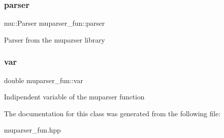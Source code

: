 \subsubsection{\texorpdfstring{parser}{parser}}
{\footnotesize\ttfamily mu\+::\+Parser muparser\+\_\+fun\+::parser\hspace{0.3cm}{\ttfamily [private]}}

Parser from the muparser library \mbox{\label{classmuparser__fun_ac4fe6d4c1437a4f66039268cdd304b75}} 
\subsubsection{\texorpdfstring{var}{var}}
{\footnotesize\ttfamily double muparser\+\_\+fun\+::var\hspace{0.3cm}{\ttfamily [private]}}

Indipendent variable of the muparser function 

The documentation for this class was generated from the following file\+:\begin{DoxyCompactItemize}
\item 
muparser\+\_\+fun.\+hpp\end{DoxyCompactItemize}
